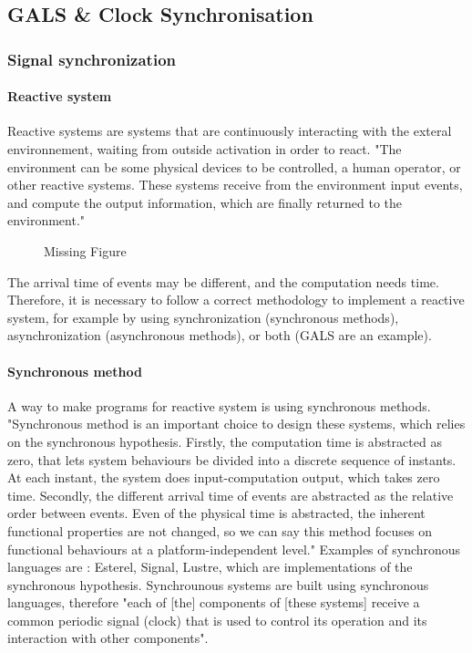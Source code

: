 \subsection{GALS \& Clock Synchronisation}

\subsubsection{Signal synchronization}

\paragraph{Reactive system} Reactive systems are systems that are continuously interacting with the exteral environnement, waiting from outside activation in order to react. "The environment can be some physical devices to be controlled, a human operator, or other reactive systems. These systems receive from the environment input events, and compute the output information, which are finally returned to the environment."\cite{SignalPaper}

\begin{figure}[H]
\centering
\caption{Missing Figure}
\end{figure}

The arrival time of events may be different, and the computation needs time. Therefore, it is necessary to follow a correct methodology to implement a reactive system, for example by using synchronization  (synchronous methods), asynchronization (asynchronous methods), or both (GALS are an example).

\paragraph{Synchronous method} A way to make programs for reactive system is using synchronous methods. "Synchronous method is an important choice to design these systems, which relies on the synchronous hypothesis. Firstly, the computation time is abstracted as zero, that lets system behaviours be divided into a discrete sequence of instants. At each instant, the system does input-computation output, which takes zero time. Secondly, the different arrival time of events are abstracted as the relative order between events. Even of the physical time is abstracted, the inherent functional properties are not changed, so we can say this method focuses on functional behaviours at a platform-independent level."\cite{SignalPaper} Examples of synchronous languages are : Esterel, Signal, Lustre, which are implementations of the synchronous hypothesis. Synchrounous systems are built using synchronous languages, therefore "each of [the] components of [these systems] receive a common periodic signal (clock) that is used to control its operation and its interaction with other components"\cite{GalsArticle}.

